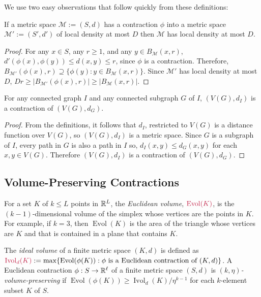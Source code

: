 \documentclass{patmorin}
\makeatletter
\newcommand{\defin}[1]{\emph{\textcolor{brightmaroon}{#1}}}
\def\mathcolor#1#{\@mathcolor{#1}}
\def\@mathcolor#1#2#3{%
  \protect\leavevmode
  \begingroup
    \color#1{#2}#3%
  \endgroup
}
\newcommand{\mathdefin}[1]{\mathcolor{brightmaroon}{#1}}
\DeclareMathOperator{\evol}{Evol}
\DeclareMathOperator{\ivol}{Ivol}
\makeatother
\begin{document}
We use two easy observations that follow quickly from these definitions:

\begin{obs}\label{contraction_increases_density}
  If a metric space $\mathcal{M}:=(S,d)$ has a contraction $\phi$ into a metric space $\mathcal{M}':=(S',d')$ of local density at most $D$ then $\mathcal{M}$ has local density at most $D$.
\end{obs}

\begin{proof}
  For any $x\in S$, any $r\ge 1$, and any $y\in B_\mathcal{M}(x,r)$, $d'(\phi(x),\phi(y))\le d(x,y)\le r$, since $\phi$ is a contraction.  Therefore, $B_{\mathcal{M'}}(\phi(x),r)\supseteq\{\phi(y):y\in B_{\mathcal{M}}(x,r)\}$.  Since $\mathcal{M'}$ has local density at most $D$,  $Dr \ge |B_\mathcal{M'}(\phi(x),r)|\ge |B_{\mathcal{M}}(x,r)|$.
\end{proof}

\begin{obs}\label{supergraph_contraction}
  For any connected graph $I$ and any connected subgraph $G$ of $I$, $(V(G),d_I)$ is a contraction of $(V(G),d_G)$.
\end{obs}

\begin{proof}
  From the definitions, it follows that $d_I$, restricted to $V(G)$ is a distance function over $V(G)$, so $(V(G),d_I)$ is a metric space.  Since $G$ is a subgraph of $I$, every path in $G$ is also a path in $I$ so, $d_I(x,y)\le d_G(x,y)$ for each $x,y\in V(G)$.  Therefore $(V(G),d_I)$ is a contraction of $(V(G),d_G)$.
\end{proof}


\subsection{Volume-Preserving Contractions}

For a set $K$ of $k\le L$ points in $\mathbb{R}^L$, the \defin{Euclidean volume}, $\mathdefin{\evol(K)}$, is the $(k-1)$-dimensional volume of the simplex whose vertices are the points in $K$.  For example, if $k=3$, then $\evol(K)$ is the area of the triangle whose vertices are $K$ and that is contained in a plane that contains $K$.

The \defin{ideal volume} of a finite metric space $(K,d)$ is defined as $\mathdefin{\ivol_d(K)}:=\max\{\evol(\phi(K)):\text{$\phi$ is a Euclidean contraction of $(K,d)$}\}$.  A Euclidean contraction $\phi:S\to\mathbb{R}^{\ell}$ of a finite metric space $(S,d)$ is \defin{$(k,\eta)$-volume-preserving} if $\evol(\phi(K))\ge \ivol_d(K)/\eta^{k-1}$ for each $k$-element subset $K$ of $S$.
\end{document}
